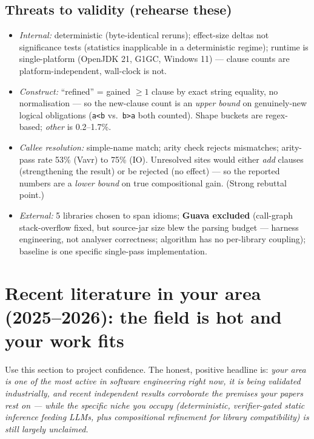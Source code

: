 \documentclass[11pt]{article}
\begin{document}
\subsection{Threats to validity (rehearse these)}

\begin{itemize}[leftmargin=1.4em,itemsep=0.05em]
  \item \emph{Internal:} deterministic (byte-identical reruns); effect-size
        deltas not significance tests (statistics inapplicable in a
        deterministic regime); runtime is single-platform (OpenJDK 21, G1GC,
        Windows 11) --- clause counts are platform-independent, wall-clock is
        not.
  \item \emph{Construct:} ``refined'' = gained $\ge 1$ clause by exact string
        equality, no normalisation --- so the new-clause count is an
        \emph{upper bound} on genuinely-new logical obligations (\texttt{a<b}
        vs.\ \texttt{b>a} both counted). Shape buckets are regex-based;
        \emph{other} is 0.2--1.7\%.
  \item \emph{Callee resolution:} simple-name match; arity check rejects
        mismatches; arity-pass rate 53\% (Vavr) to 75\% (IO). Unresolved sites
        would either \emph{add} clauses (strengthening the result) or be
        rejected (no effect) --- so the reported numbers are a \emph{lower
        bound} on true compositional gain. (Strong rebuttal point.)
  \item \emph{External:} 5 libraries chosen to span idioms; \textbf{Guava
        excluded} (call-graph stack-overflow fixed, but source-jar size blew
        the parsing budget --- harness engineering, not analyser correctness;
        algorithm has no per-library coupling); baseline is one specific
        single-pass implementation.
\end{itemize}

\section{Recent literature in your area (2025--2026): the field is hot and your work fits}
\label{sec:recent}

Use this section to project confidence. The honest, positive headline is:
\emph{your area is one of the most active in software engineering right now, it
is being validated industrially, and recent independent results corroborate the
premises your papers rest on --- while the specific niche you occupy
(deterministic, verifier-gated static inference feeding LLMs, plus compositional
refinement for library compatibility) is still largely unclaimed.}
\end{document}
